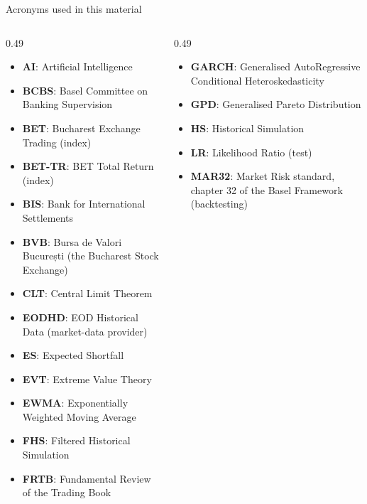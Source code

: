 {
\begin{frame}[noframenumbering]
    \titlepage
\end{frame}
}
\begin{frame}{Acronyms used in this material}
\begin{columns}[T]
\begin{column}{0.49\textwidth}
\begin{itemize}\setlength{\itemsep}{0pt}
    \item \textbf{AI}: Artificial Intelligence
    \item \textbf{BCBS}: Basel Committee on Banking Supervision
    \item \textbf{BET}: Bucharest Exchange Trading (index)
    \item \textbf{BET-TR}: BET Total Return (index)
    \item \textbf{BIS}: Bank for International Settlements
    \item \textbf{BVB}: Bursa de Valori București (the Bucharest Stock Exchange)
    \item \textbf{CLT}: Central Limit Theorem
    \item \textbf{EODHD}: EOD Historical Data (market-data provider)
    \item \textbf{ES}: Expected Shortfall
    \item \textbf{EVT}: Extreme Value Theory
    \item \textbf{EWMA}: Exponentially Weighted Moving Average
    \item \textbf{FHS}: Filtered Historical Simulation
    \item \textbf{FRTB}: Fundamental Review of the Trading Book
\end{itemize}
\end{column}
\begin{column}{0.49\textwidth}
\begin{itemize}\setlength{\itemsep}{0pt}
    \item \textbf{GARCH}: Generalised AutoRegressive Conditional Heteroskedasticity
    \item \textbf{GPD}: Generalised Pareto Distribution
    \item \textbf{HS}: Historical Simulation
    \item \textbf{LR}: Likelihood Ratio (test)
    \item \textbf{MAR32}: Market Risk standard, chapter 32 of the Basel Framework (backtesting)

\end{itemize}
\end{column}
\end{columns}
\end{frame}
